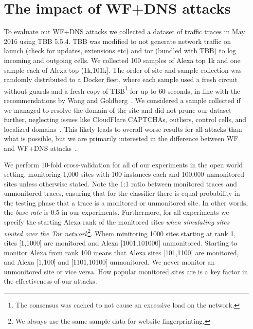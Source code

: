 \section{The impact of WF+DNS attacks}
\label{sec:analysis}
To evaluate out WF+DNS attacks we collected a dataset of traffic traces in May
2016 using TBB 5.5.4.
TBB was modified to not generate network traffic on launch (check for
updates, extensions etc) and
tor (bundled with TBB) to log incoming and outgoing cells.
We collected 100 samples of Alexa top 1k and one sample each of
Alexa top (1k,101k]. The order of site and sample collection was randomly
distributed to a Docker fleet, where each sample used a fresh circuit without
guards and a fresh copy of TBB\footnote{The consensus was cached to not
cause an excessive load on the network.} for up to 60 seconds,
in line with the recommendations by Wang and Goldberg~\cite{Wang2013a}.
We considered a sample collected if we managed to resolve the domain of the site
and did not prune our dataset further, neglecting issues like CloudFlare
CAPTCHAs, outliers, control cells, and localized domains~\cite{Juarez2014a}.
This likely leads to overall worse results for all attacks than what is
possible, but we are primarily interested in the difference between WF and
WF+DNS attacks~\cite{Wang2013a}.

We perform 10-fold cross-validation for all of our experiments in the open
world setting, monitoring 1,000 sites with 100 instances each and
100,000 unmonitored sites unless otherwise stated.
Note the 1:1 ratio between monitored traces and unmonitored traces,
ensuring that for the classifier there is equal probability in the testing
phase that a trace is a monitored or unmonitored site.
In other words, the \emph{base rate} is 0.5 in our experiments.
Furthermore, for all experiments we specify the starting Alexa rank of the
monitored sites
\emph{when simulating sites visited over the Tor network}\footnote{We always
use the same sample data for website fingerprinting.}.
Whem minitoring 1000 sites starting at rank 1, sites
[1,1000] are monitored and Alexa [1001,101000] unmonitored. Starting to
monitor Alexa from rank 100 means that Alexa sites [101,1100] are monitored,
and Alexa [1,100] and [1101,10100] unmonitored.
We never monitor an unmonitored site or vice versa.
How popular monitored sites
are is a key factor in the effectiveness of our attacks.


